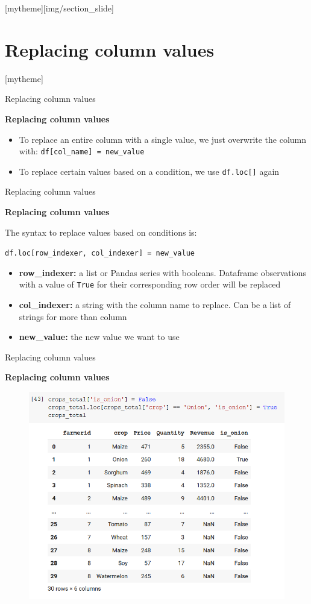\documentclass[aspectratio=169]{beamer}
\newcommand{\sectionpic}[2]{
	\setbeamertemplate{section page}[mytheme][#2]
	\section{#1}
	\setbeamertemplate{section page}[mytheme]
}
\begin{document}
\sectionpic{Replacing column values}{img/section_slide}

\begin{frame}{Replacing column values}

	\textbf{Replacing column values}

	\begin{itemize}
		\item To replace an entire column with a single value, we just overwrite the column with: \texttt{df[col\_name] = new\_value}
		\item To replace certain values based on a condition, we use \texttt{df.loc[]} again
	\end{itemize}

\end{frame}

\begin{frame}{Replacing column values}

	\textbf{Replacing column values}

	The syntax to replace values based on conditions is:

	\texttt{df.loc[row\_indexer, col\_indexer] = new\_value}

	\begin{itemize}
		\item \textbf{row\_indexer:} a list or Pandas series with booleans. Dataframe observations with a value of \texttt{True} for their corresponding row order will be replaced
		\item \textbf{col\_indexer:} a string with the column name to replace. Can be a list of strings for more than column
		\item \textbf{new\_value:} the new value we want to use
	\end{itemize}

\end{frame}

\begin{frame}{Replacing column values}

	\textbf{Replacing column values}

	\begin{figure}
		\centering
		\includegraphics[width=0.57\linewidth]{img/replace_values.png}
	\end{figure}

\end{frame}
\end{document}
